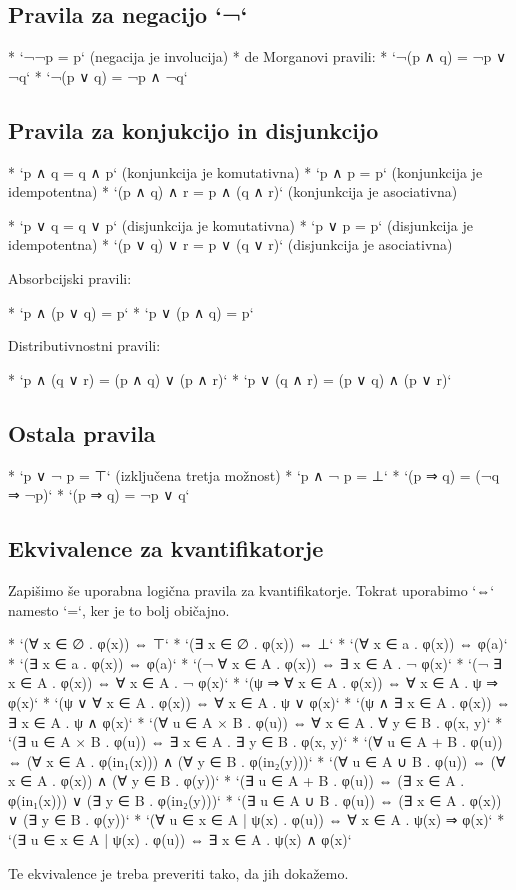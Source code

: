 \subsection{Pravila za negacijo `¬`}

* `¬¬p = p` (negacija je involucija)
* de Morganovi pravili:
    * `¬(p ∧ q) = ¬p ∨ ¬q`
    * `¬(p ∨ q) = ¬p ∧ ¬q`

\subsection{Pravila za konjukcijo in disjunkcijo}

* `p ∧ q = q ∧ p` (konjunkcija je komutativna)
* `p ∧ p = p` (konjunkcija je idempotentna)
* `(p ∧ q) ∧ r = p ∧ (q ∧ r)` (konjunkcija je asociativna)

* `p ∨ q = q ∨ p` (disjunkcija je komutativna)
* `p ∨ p = p` (disjunkcija je idempotentna)
* `(p ∨ q) ∨ r = p ∨ (q ∨ r)` (disjunkcija je asociativna)

Absorbcijski pravili:

* `p ∧ (p ∨ q) = p`
* `p ∨ (p ∧ q) = p`

Distributivnostni pravili:

* `p ∧ (q ∨ r) = (p ∧ q) ∨ (p ∧ r)`
* `p ∨ (q ∧ r) = (p ∨ q) ∧ (p ∨ r)`

\subsection{Ostala pravila}

* `p ∨ ¬ p = ⊤` (izključena tretja možnost)
* `p ∧ ¬ p = ⊥`
* `(p ⇒ q) = (¬q ⇒ ¬p)`
* `(p ⇒ q) = ¬p ∨ q`

\subsection{Ekvivalence za kvantifikatorje}

Zapišimo še uporabna logična pravila za kvantifikatorje. Tokrat uporabimo `⇔`
namesto `=`, ker je to bolj običajno.

* `(∀ x ∈ ∅ . φ(x)) ⇔ ⊤`
* `(∃ x ∈ ∅ . φ(x)) ⇔ ⊥`
* `(∀ x ∈ {a} . φ(x)) ⇔ φ(a)`
* `(∃ x ∈ {a} . φ(x)) ⇔ φ(a)`
* `(¬ ∀ x ∈ A . φ(x)) ⇔ ∃ x ∈ A . ¬ φ(x)`
* `(¬ ∃ x ∈ A . φ(x)) ⇔ ∀ x ∈ A . ¬ φ(x)`
* `(ψ ⇒ ∀ x ∈ A . φ(x)) ⇔ ∀ x ∈ A . ψ ⇒ φ(x)`
* `(ψ ∨ ∀ x ∈ A . φ(x)) ⇔ ∀ x ∈ A . ψ ∨ φ(x)`
* `(ψ ∧ ∃ x ∈ A . φ(x)) ⇔ ∃ x ∈ A . ψ ∧ φ(x)`
* `(∀ u ∈ A × B . φ(u)) ⇔ ∀ x ∈ A . ∀ y ∈ B . φ(x, y)`
* `(∃ u ∈ A × B . φ(u)) ⇔ ∃ x ∈ A . ∃ y ∈ B . φ(x, y)`
* `(∀ u ∈ A + B . φ(u)) ⇔ (∀ x ∈ A . φ(in₁(x))) ∧ (∀ y ∈ B . φ(in₂(y)))`
* `(∀ u ∈ A ∪ B . φ(u)) ⇔ (∀ x ∈ A . φ(x)) ∧ (∀ y ∈ B . φ(y))`
* `(∃ u ∈ A + B . φ(u)) ⇔ (∃ x ∈ A . φ(in₁(x))) ∨ (∃ y ∈ B . φ(in₂(y)))`
* `(∃ u ∈ A ∪ B . φ(u)) ⇔ (∃ x ∈ A . φ(x)) ∨ (∃ y ∈ B . φ(y))`
* `(∀ u ∈ {x ∈ A | ψ(x)} . φ(u)) ⇔ ∀ x ∈ A . ψ(x) ⇒ φ(x)`
* `(∃ u ∈ {x ∈ A | ψ(x)} . φ(u)) ⇔ ∃ x ∈ A . ψ(x) ∧ φ(x)`

Te ekvivalence je treba preveriti tako, da jih dokažemo.
